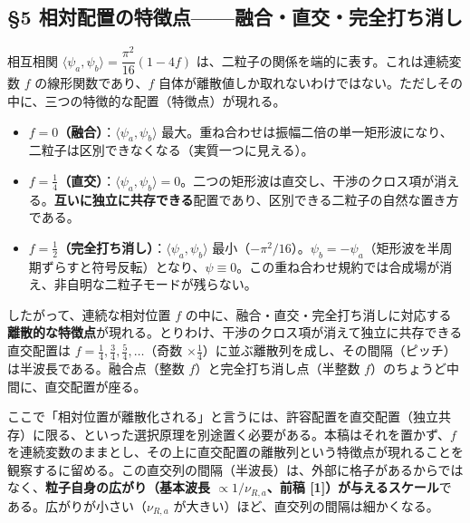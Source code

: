 \documentclass[
]{ltjsarticle}
\providecommand{\tightlist}{%
  \setlength{\itemsep}{0pt}\setlength{\parskip}{0pt}}
\begin{document}
\subsection{§5
相対配置の特徴点------融合・直交・完全打ち消し}\label{ux76f8ux5bfeux914dux7f6eux306eux7279ux5fb4ux70b9ux878dux5408ux76f4ux4ea4ux5b8cux5168ux6253ux3061ux6d88ux3057}

相互相関 \(\langle\psi_a,\psi_b\rangle=\dfrac{\pi^2}{16}(1-4f)\)
は、二粒子の関係を端的に表す。これは連続変数 \(f\)
の線形関数であり、\(f\)
自体が離散値しか取れないわけではない。ただしその中に、三つの特徴的な配置（特徴点）が現れる。

\begin{itemize}
\tightlist
\item
  \textbf{\(f=0\)（融合）}：\(\langle\psi_a,\psi_b\rangle\)
  最大。重ね合わせは振幅二倍の単一矩形波になり、二粒子は区別できなくなる（実質一つに見える）。
\item
  \textbf{\(f=\tfrac14\)（直交）}：\(\langle\psi_a,\psi_b\rangle=0\)。二つの矩形波は直交し、干渉のクロス項が消える。\textbf{互いに独立に共存できる}配置であり、区別できる二粒子の自然な置き方である。
\item
  \textbf{\(f=\tfrac12\)（完全打ち消し）}：\(\langle\psi_a,\psi_b\rangle\)
  最小（\(-\pi^2/16\)）。\(\psi_b=-\psi_a\)（矩形波を半周期ずらすと符号反転）となり、\(\psi\equiv0\)。この重ね合わせ規約では合成場が消え、非自明な二粒子モードが残らない。
\end{itemize}

したがって、連続な相対位置 \(f\)
の中に、融合・直交・完全打ち消しに対応する\textbf{離散的な特徴点}が現れる。とりわけ、干渉のクロス項が消えて独立に共存できる直交配置は
\(f=\tfrac14,\tfrac34,\tfrac54,\dots\)（奇数
\(\times\tfrac14\)）に並ぶ離散列を成し、その間隔（ピッチ）は半波長である。融合点（整数
\(f\)）と完全打ち消し点（半整数
\(f\)）のちょうど中間に、直交配置が座る。

ここで「相対位置が離散化される」と言うには、許容配置を直交配置（独立共存）に限る、といった選択原理を別途置く必要がある。本稿はそれを置かず、\(f\)
を連続変数のままとし、その上に直交配置の離散列という特徴点が現れることを観察するに留める。この直交列の間隔（半波長）は、外部に格子があるからではなく、\textbf{粒子自身の広がり（基本波長
\(\propto1/\nu_{R,a}\)、前稿
{[}1{]}）が与えるスケール}である。広がりが小さい（\(\nu_{R,a}\)
が大きい）ほど、直交列の間隔は細かくなる。
\end{document}
